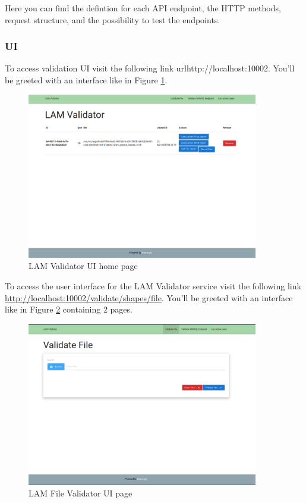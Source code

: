 Here you can find the defintion for each API endpoint, the HTTP methods, request structure, and the possibility to test the endpoints.

\subsubsection{UI}
To access validation UI visit the following link url{http://localhost:10002}. You'll be greeted with an interface like in Figure \ref{fig:validator-ui-home}.

\begin{figure}[H]
  \centering
  \includegraphics[width=0.9\textwidth]{images/usage/validator-ui-home.png}
  \caption{LAM Validator UI home page}
  \label{fig:validator-ui-home}
\end{figure}

To access the user interface for the LAM Validator service visit the following link \url{http://localhost:10002/validate/shapes/file}. You'll be greeted with an interface like in Figure \ref{fig:validator-ui-file} containing 2 pages.

\begin{figure}[H]
  \centering
  \includegraphics[width=0.9\textwidth]{images/usage/validator-ui-file.png}
  \caption{LAM File Validator UI page}
  \label{fig:validator-ui-file}
\end{figure} 

